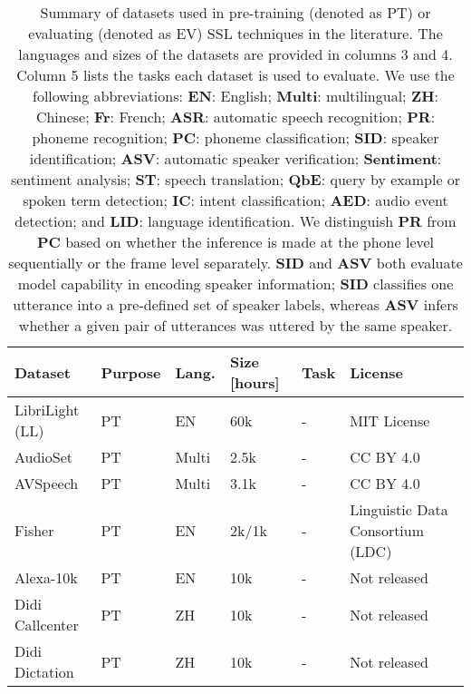 \begin{table*}[ht]
  \centering
  \scriptsize %
  \caption{Summary of datasets used in pre-training (denoted as PT) or
  evaluating (denoted as EV) SSL techniques in the literature. The languages and
  sizes of the datasets are provided in columns 3 and 4. Column 5 lists the tasks each
  dataset is used to evaluate. We use the following abbreviations:
  \textbf{EN}: English; 
  \textbf{Multi}: multilingual;     %
  \textbf{ZH}: Chinese;
  \textbf{Fr}: French; \textbf{ASR}: automatic speech recognition; \textbf{PR}:
  phoneme recognition; \textbf{PC}: phoneme classification; \textbf{SID}:
  speaker identification; \textbf{ASV}: automatic speaker verification;
  \textbf{Sentiment}: sentiment analysis; \textbf{ST}: speech translation;
  \textbf{QbE}: query by example or spoken term detection; \textbf{IC}: intent
  classification; \textbf{AED}: audio event detection; and \textbf{LID}: language
  identification. We distinguish \textbf{PR} from \textbf{PC} based on whether
  the inference is made at the phone level sequentially or the frame level separately.
  \textbf{SID} and \textbf{ASV} both evaluate model capability in encoding
  speaker information; \textbf{SID} classifies one utterance into a pre-defined
  set of speaker labels, whereas \textbf{ASV} infers whether a given pair of
  utterances was uttered by the same speaker.}
  \label{table:datasets}
  {\renewcommand*\arraystretch{1.2}
  \begin{tabular}{llllll}
    \toprule
    Dataset & Purpose & Lang. & Size [hours] & Task & License \\
    \midrule
    LibriLight (LL) & PT & EN & 60k & - & MIT License \\ \hline
    AudioSet & PT & Multi & 2.5k & - & CC BY 4.0 \\ \hline %
    AVSpeech & PT & Multi & 3.1k & - & CC BY 4.0 \\ \hline %
    Fisher & PT & EN & 2k/1k \cite{jiang2021further}  & - & Linguistic Data Consortium (LDC) \\ \hline %

    Alexa-10k & PT & EN & 10k & - & Not released \\ \hline %
    Didi Callcenter & PT & ZH & 10k & - & Not released \\ \hline %
    Didi Dictation & PT & ZH & 10k & - & Not released \\ \hline %


\end{tabular}}
\end{table*}
